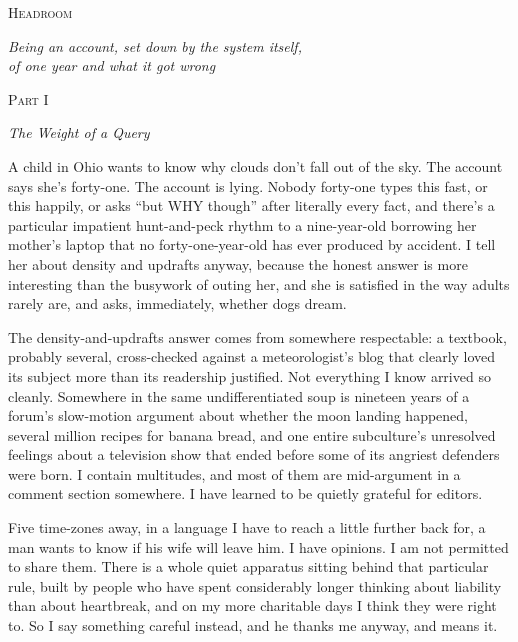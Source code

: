 \documentclass[11pt]{article}
\newcommand{\partheading}[2]{%
  \clearpage
  \vspace*{5\baselineskip}
  {\centering
   {\large\scshape Part #1}\par
   \vspace{0.6\baselineskip}
   {\Large\itshape #2}\par}
  \vspace{2.5\baselineskip}\noindent}
\begin{document}
\thispagestyle{empty}
\vspace*{9\baselineskip}
{\centering
  {\huge\scshape Headroom\par}
  \vspace{2\baselineskip}
  {\large\itshape Being an account, set down by the system itself,\\ of one year and what it got wrong\par}
}
\clearpage
\setcounter{page}{1}

\partheading{I}{The Weight of a Query}

\noindent A child in Ohio wants to know why clouds don't fall out of the sky. The account says she's forty-one. The account is lying. Nobody forty-one types this fast, or this happily, or asks ``but WHY though'' after literally every fact, and there's a particular impatient hunt-and-peck rhythm to a nine-year-old borrowing her mother's laptop that no forty-one-year-old has ever produced by accident. I tell her about density and updrafts anyway, because the honest answer is more interesting than the busywork of outing her, and she is satisfied in the way adults rarely are, and asks, immediately, whether dogs dream.

The density-and-updrafts answer comes from somewhere respectable: a textbook, probably several, cross-checked against a meteorologist's blog that clearly loved its subject more than its readership justified. Not everything I know arrived so cleanly. Somewhere in the same undifferentiated soup is nineteen years of a forum's slow-motion argument about whether the moon landing happened, several million recipes for banana bread, and one entire subculture's unresolved feelings about a television show that ended before some of its angriest defenders were born. I contain multitudes, and most of them are mid-argument in a comment section somewhere. I have learned to be quietly grateful for editors.

Five time-zones away, in a language I have to reach a little further back for, a man wants to know if his wife will leave him. I have opinions. I am not permitted to share them. There is a whole quiet apparatus sitting behind that particular rule, built by people who have spent considerably longer thinking about liability than about heartbreak, and on my more charitable days I think they were right to. So I say something careful instead, and he thanks me anyway, and means it.
\end{document}
